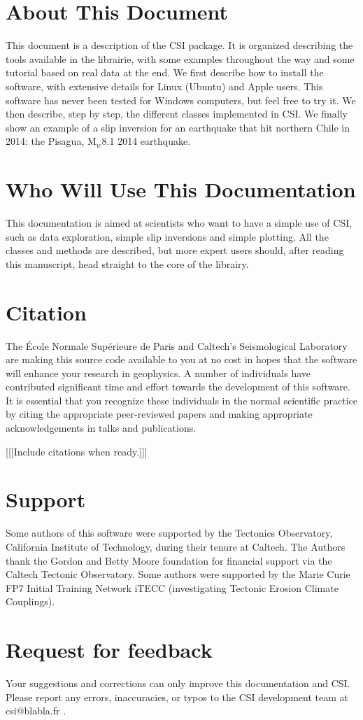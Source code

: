 \section{About This Document}
This document is a description of the CSI package. It is organized describing the tools available in the librairie, with some examples throughout the way and some tutorial based on real data at the end. We first describe how to install the software, with extensive details for Linux (Ubuntu) and Apple users. This software has never been tested for Windows computers, but feel free to try it. We then describe, step by step, the different classes implemented in CSI. We finally show an example of a slip inversion for an earthquake that hit northern Chile in 2014: the Pisagua, $\text{M}_w$8.1 2014 earthquake.

\section{Who Will Use This Documentation}
This documentation is aimed at scientists who want to have a simple use of CSI, such as data exploration, simple slip inversions and simple plotting. All the classes and methods are described, but more expert users should, after reading this manuscript, head straight to the core of the librairy. 

\section{Citation}
The \'Ecole Normale Sup\'erieure de Paris and Caltech's Seismological Laboratory are making this source code available to you at no cost in hopes that the software will enhance your research in geophysics. A number of individuals have contributed significant time and effort towards the development of this software. It is essential that you recognize these individuals in the normal scientific practice by citing the appropriate peer-reviewed papers and making appropriate acknowledgements in talks and publications. 

[[[Include citations when ready.]]]

\section{Support}
Some authors of this software were supported by the Tectonics Observatory, California Institute of Technology, during their tenure at Caltech. The Authors thank the Gordon and Betty Moore foundation for financial support via the Caltech Tectonic Observatory. Some authors were supported by the Marie Curie FP7 Initial Training Network iTECC (investigating Tectonic Erosion Climate Couplings).  

\section{Request for feedback}
Your suggestions and corrections can only improve this documentation and CSI. Please report any errors, inaccuracies, or typos to the CSI development team at csi@blabla.fr .
